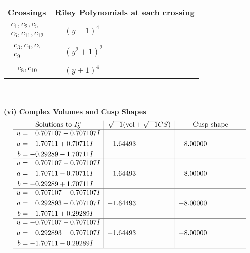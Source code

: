 \documentclass[1p]{elsarticle_modified}
\theoremstyle{definition}
\newcommand{\I}{\sqrt{-1}}
\begin{document}
\begin{tabular}{m{50pt}|m{274pt}}
Crossings & \hspace{64pt}Riley Polynomials at each crossing \\
\hline $$\begin{aligned}c_{1},c_{2},c_{5}\\c_{6},c_{11},c_{12}\end{aligned}$$&$\begin{aligned}
&(y-1)^4
\end{aligned}$\\
\hline $$\begin{aligned}c_{3},c_{4},c_{7}\\c_{9}\end{aligned}$$&$\begin{aligned}
&(y^2+1)^2
\end{aligned}$\\
\hline $$\begin{aligned}c_{8},c_{10}\end{aligned}$$&$\begin{aligned}
&(y+1)^4
\end{aligned}$\\
\hline
\end{tabular}\\~\\
\newpage\flushleft \textbf{(vi) Complex Volumes and Cusp Shapes}
$$\begin{array}{c|c|c}  
\text{Solutions to }I^u_{5}& \I (\text{vol} + \sqrt{-1}CS) & \text{Cusp shape}\\
 \hline 
\begin{aligned}
u &= \phantom{-}0.707107 + 0.707107 I \\
a &= \phantom{-}1.70711 + 0.70711 I \\
b &= -0.29289 - 1.70711 I\end{aligned}
 & -1.64493\phantom{ +0.000000I} & -8.00000\phantom{ +0.000000I} \\ \hline\begin{aligned}
u &= \phantom{-}0.707107 - 0.707107 I \\
a &= \phantom{-}1.70711 - 0.70711 I \\
b &= -0.29289 + 1.70711 I\end{aligned}
 & -1.64493\phantom{ +0.000000I} & -8.00000\phantom{ +0.000000I} \\ \hline\begin{aligned}
u &= -0.707107 + 0.707107 I \\
a &= \phantom{-}0.292893 + 0.707107 I \\
b &= -1.70711 + 0.29289 I\end{aligned}
 & -1.64493\phantom{ +0.000000I} & -8.00000\phantom{ +0.000000I} \\ \hline\begin{aligned}
u &= -0.707107 - 0.707107 I \\
a &= \phantom{-}0.292893 - 0.707107 I \\
b &= -1.70711 - 0.29289 I\end{aligned}
 & -1.64493\phantom{ +0.000000I} & -8.00000\phantom{ +0.000000I}\\
 \hline 
 \end{array}$$\newpage\newpage\renewcommand{\arraystretch}{1}
\end{document}
